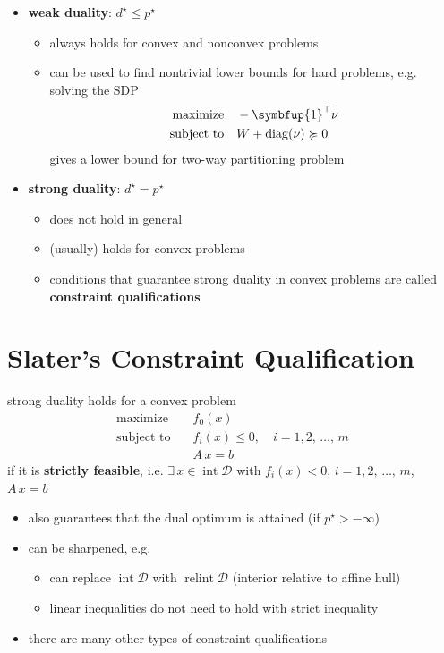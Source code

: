 \documentclass[11pt]{extarticle}
\newcommand{\ds}{\displaystyle}
\DeclareMathOperator*{\diag}{diag}
\DeclareMathOperator*{\inte}{int}
\DeclareMathOperator*{\relint}{relint}
\theoremstyle{definition}
\begin{document}
\begin{itemize}
  \item {\bf weak duality}: $\ds d^\star\leqslant p^\star$
    \begin{itemize}
      \item always holds for convex and nonconvex problems 
      \item can be used to find nontrivial lower bounds for hard problems, e.g. solving the SDP
        \begin{align*}
          \text{maximize}\quad & -\symbfup{1}^\top\nu \\
          \text{subject to}\quad & W + \diag(\nu)\succcurlyeq 0 
        \end{align*}
        gives a lower bound for two-way partitioning problem
    \end{itemize}
  \item {\bf strong duality}: $\ds d^\star = p^\star$
    \begin{itemize}
      \item does not hold in general 
      \item (usually) holds for convex problems
      \item conditions that guarantee strong duality in convex problems are called {\bf constraint qualifications}
    \end{itemize}
\end{itemize}

\newpage

\section*{Slater's Constraint Qualification}
strong duality holds for a convex problem
\begin{align*}
  \text{maximize}\quad & f_0(x) \\
  \text{subject to}\quad &f_i(x)\leqslant 0, \quad i = 1, 2,\,\ldots,\,m \\
  \qquad\qquad & A\, x = b
\end{align*}
if it is {\bf strictly feasible}, i.e. $\ds\exists\,x\in\inte\mathcal{D}$ with $\ds f_i(x) < 0$, $\ds i = 1, 2,\,\ldots,\,m$, $A\,x = b$  
\begin{itemize}
  \item also guarantees that the dual optimum is attained (if $\ds p^\star > -\infty$)
  \item can be sharpened, e.g.
    \begin{itemize}
      \item can replace $\ds\inte\mathcal{D}$ with $\ds\relint\mathcal{D}$ (interior relative to affine hull)
      \item linear inequalities do not need to hold with strict inequality
    \end{itemize}
  \item there are many other types of constraint qualifications
\end{itemize}
\end{document}
